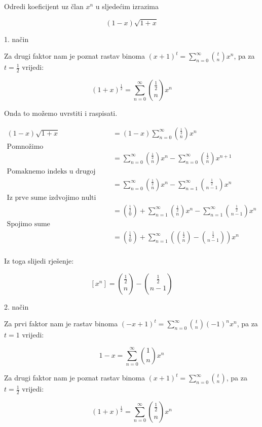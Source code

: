 \documentclass[exam.tex]{subfiles}
\begin{document}
	Odredi koeficijent uz član \( x^n \) u sljedećim izrazima
	
	\[ (1 - x) \sqrt{1 + x} \]
	
	1. način
	
	Za drugi faktor nam je poznat rastav binoma \( (x + 1)^t = \sum\limits^\infty_{n=0} \binom{t}{n} x^n \), pa za \( t = \frac{1}{2} \) vrijedi:
	
	\[ (1 + x)^{\frac{1}{2}} = \sum\limits^\infty_{n=0} \binom{\frac{1}{2}}{n} x^n \]
	
	Onda to možemo uvrstiti i raspisati.
	
	\begin{align*}
		(1 - x) \sqrt{1 + x} &= (1 - x) \sum\limits^\infty_{n=0} \binom{\frac{1}{2}}{n} x^n \\
		\text{Pomnožimo} \\
		&= \sum\limits^\infty_{n=0} \binom{\frac{1}{2}}{n} x^n - \sum\limits^\infty_{n=0} \binom{\frac{1}{2}}{n} x^{n + 1} \\
		\text{Pomaknemo indeks u drugoj sumi} \\
		&= \sum\limits^\infty_{n=0} \binom{\frac{1}{2}}{n} x^n - \sum\limits^\infty_{n=1} \binom{\frac{1}{2}}{n - 1} x^{n} \\
		\text{Iz prve sume izdvojimo nulti element} \\
		&= \binom{\frac{1}{2}}{0} + \sum\limits^\infty_{n=1} \binom{\frac{1}{2}}{n} x^n - \sum\limits^\infty_{n=1} \binom{\frac{1}{2}}{n - 1} x^{n} \\
		\text{Spojimo sume} \\
		&= \binom{\frac{1}{2}}{0} + \sum\limits^\infty_{n=1} \left ( \binom{\frac{1}{2}}{n} -  \binom{\frac{1}{2}}{n - 1} \right ) x^{n} \\
	\end{align*}
	
	Iz toga slijedi rješenje:
	
	\[ [x^n] = \binom{\frac{1}{2}}{n} - \binom{\frac{1}{2}}{n - 1} \] 	
	
	2. način
	
	Za prvi faktor nam je rastav binoma \( (-x + 1)^t = \sum\limits^\infty_{n=0} \binom{t}{n} (-1)^n x^n \), pa za \( t = 1 \) vrijedi:
	
	\[ 1 - x = \sum\limits^\infty_{n=0} \binom{1}{n} x^n \]
	
	Za drugi faktor nam je poznat rastav binoma \( (x + 1)^t = \sum\limits^\infty_{n=0} \binom{t}{n} \), pa za \( t = \frac{1}{2} \) vrijedi:
	
	\[ (1 + x)^{\frac{1}{2}} = \sum\limits^\infty_{n=0} \binom{\frac{1}{2}}{n} x^n \]
	
\end{document}
